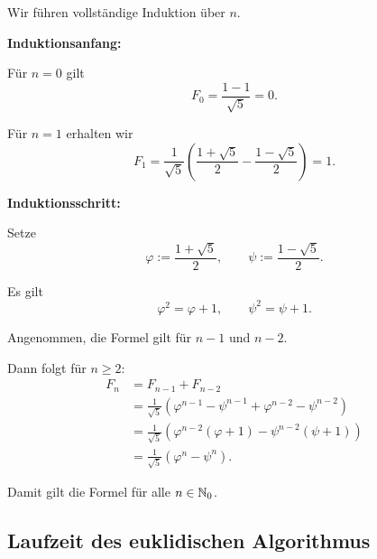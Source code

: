 \begin{myproof}
  Wir führen vollständige Induktion über $n$.

  \textbf{Induktionsanfang:}

  Für $n=0$ gilt
  \[
    F_0=\frac{1-1}{\sqrt5}=0.
  \]

  Für $n=1$ erhalten wir
  \[
    F_1
    =\frac1{\sqrt5}
     \left(
       \frac{1+\sqrt5}{2}
       -\frac{1-\sqrt5}{2}
     \right)
    =1.
  \]

  \textbf{Induktionsschritt:}

  Setze
  \[
    \varphi:=\frac{1+\sqrt5}{2},
    \qquad
    \psi:=\frac{1-\sqrt5}{2}.
  \]

  Es gilt
  \[
    \varphi^2=\varphi+1,
    \qquad
    \psi^2=\psi+1.
  \]

  Angenommen, die Formel gilt für
  $n-1$ und $n-2$.

  Dann folgt für $n\ge2$:
  \begin{align*}
    F_n
    &=F_{n-1}+F_{n-2}\\
    &=\frac1{\sqrt5}
      \left(
        \varphi^{n-1}-\psi^{n-1}
        +\varphi^{n-2}-\psi^{n-2}
      \right)\\
    &=\frac1{\sqrt5}
      \left(
        \varphi^{n-2}(\varphi+1)
        -\psi^{n-2}(\psi+1)
      \right)\\
    &=\frac1{\sqrt5}
      \left(\varphi^n-\psi^n\right).
  \end{align*}

  Damit gilt die Formel für alle
  $n\in\mathbb{N}_0$.
\end{myproof}


\subsection{Laufzeit des euklidischen Algorithmus}


